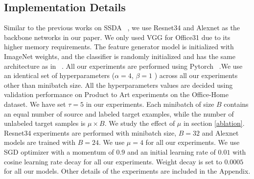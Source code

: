\subsection{Implementation Details}
Similar to the previous works on SSDA ~\cite{Saito2019SemiSupervisedDA, Kim2020AttractPA, Li2020OnlineMF}, we use Resnet34 and Alexnet as the backbone networks in our paper. We only used VGG for Office31 due to its higher memory requirements. The feature generator model is initialized with ImageNet weights, and the classifier is randomly initialized and has the same architecture as in ~\cite{Saito2019SemiSupervisedDA, Kim2020AttractPA, Li2020OnlineMF}. All our experiments are performed using Pytorch ~\cite{Paszke2019PyTorchAI}.We use an identical set of hyperparameters ($\alpha= 4$, $\beta= 1$ ) across all our experiments other than minibatch size. All the hyperparameters values are decided using validation performance on Product to Art experiments on the Office-Home dataset. We have set $\tau=5$ in our experiments. Each minibatch of size $B$  contains an equal number of source and labeled target examples, while the number of unlabeled target samples is $\mu \times B$. We study the effect of $\mu$ in section \ref{ablation}. Resnet34 experiments are performed with minibatch size, $B= 32$ and Alexnet models are trained with $B= 24$. We use $\mu=4$ for all our experiments. We use SGD optimizer with a momentum of $0.9$ and an initial learning rate of $0.01$ with cosine learning rate decay for all our experiments. Weight decay is set to $0.0005$ for all our models. Other details of the experiments are included in the Appendix.
